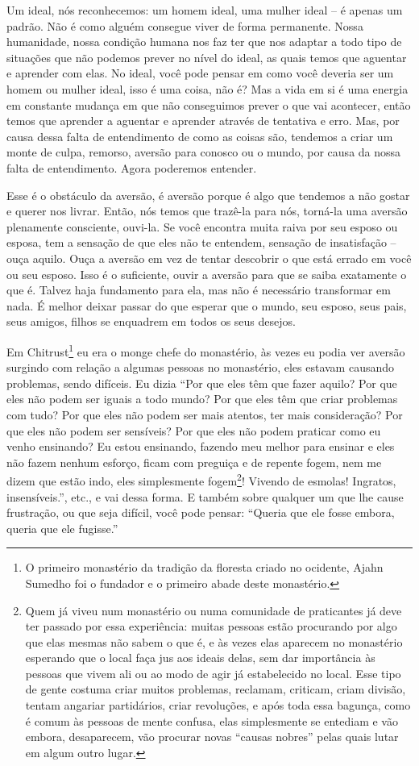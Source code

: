 Um ideal, nós reconhecemos: um homem ideal, uma mulher ideal – é
apenas um padrão. Não é como alguém consegue viver de forma permanente.
Nossa humanidade, nossa condição humana nos faz ter que nos adaptar a
todo tipo de situações que não podemos prever no nível do ideal, as
quais temos que aguentar e aprender com elas. No ideal, você pode
pensar em como você deveria ser um homem ou mulher ideal, isso é uma
coisa, não é? Mas a vida em si é uma energia em constante mudança em
que não conseguimos prever o que vai acontecer, então temos que
aprender a aguentar e aprender através de tentativa e erro. Mas, por
causa dessa falta de entendimento de como as coisas são, tendemos a
criar um monte de culpa, remorso, aversão para conosco ou o mundo, por
causa da nossa falta de entendimento. Agora poderemos entender.

Esse é o obstáculo da aversão, é aversão porque é algo que tendemos
a não gostar e querer nos livrar. Então, nós temos que trazê-la para
nós, torná-la uma aversão plenamente consciente, ouvi-la. Se você
encontra muita raiva por seu esposo ou esposa, tem a sensação de que
eles não te entendem, sensação de insatisfação – ouça aquilo. Ouça a
aversão em vez de tentar descobrir o que está errado em você ou seu
esposo. Isso é o suficiente, ouvir a aversão para que se saiba
exatamente o que é. Talvez haja fundamento para ela, mas não é
necessário transformar em nada. É melhor deixar passar do que esperar
que o mundo, seu esposo, seus pais, seus amigos, filhos se enquadrem em
todos os seus desejos.

Em Chitrust\footnote{O primeiro monastério da tradição da floresta
criado no ocidente, Ajahn Sumedho foi o fundador e o primeiro abade
deste monastério.} eu era o monge chefe do monastério, às vezes eu
podia ver aversão surgindo com relação a algumas pessoas no monastério,
eles estavam causando problemas, sendo difíceis. Eu dizia “Por que eles
têm que fazer aquilo? Por que eles não podem ser iguais a todo mundo?
Por que eles têm que criar problemas com tudo? Por que eles não podem
ser mais atentos, ter mais consideração? Por que eles não podem ser
sensíveis? Por que eles não podem praticar como eu venho ensinando? Eu
estou ensinando, fazendo meu melhor para ensinar e eles não fazem
nenhum esforço, ficam com preguiça e de repente fogem, nem me dizem que
estão indo, eles simplesmente fogem\footnote{Quem já viveu num
monastério ou numa comunidade de praticantes já deve ter passado por
essa experiência: muitas pessoas estão procurando por algo que elas
mesmas não sabem o que é, e às vezes elas aparecem no monastério
esperando que o local faça jus aos ideais delas, sem dar importância às
pessoas que vivem ali ou ao modo de agir já estabelecido no local. Esse
tipo de gente costuma criar muitos problemas, reclamam, criticam, criam
divisão, tentam angariar partidários, criar revoluções, e após toda
essa bagunça, como é comum às pessoas de mente confusa, elas
simplesmente se entediam e vão embora, desaparecem, vão procurar novas
“causas nobres” pelas quais lutar em algum outro lugar.}! Vivendo de
esmolas! Ingratos, insensíveis.”, etc., e vai dessa forma. E também
sobre qualquer um que lhe cause frustração, ou que seja difícil, você
pode pensar: “Queria que ele fosse embora, queria que ele fugisse.”

